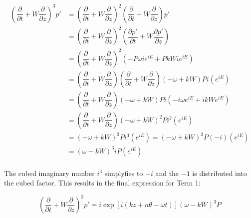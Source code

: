 \documentclass[]{aiaa-tc}%
\begin{document}
\begin{align*}
\left( \dfrac{\partial}{\partial t} + W \dfrac{\partial}{\partial z} \right)^3 p'
&= \left( \dfrac{\partial}{\partial t} + W \dfrac{\partial}{\partial z}
   \right)^2
   \left( \dfrac{\partial}{\partial t} + W \dfrac{\partial}{\partial z}
   \right)p' \\
&= \left( \dfrac{\partial}{\partial t} + W \dfrac{\partial}{\partial z}
   \right)^2
   \left( \dfrac{\partial p'}{\partial t} + W \dfrac{\partial p'}{\partial z}
   \right) \\
&= \left( \dfrac{\partial}{\partial t} + W \dfrac{\partial}{\partial z}
   \right)^2
   \left( -P\omega ie^{iE} + PkW ie^{iE}
   \right) \\
&= \left( \dfrac{\partial}{\partial t} + W \dfrac{\partial}{\partial z}
   \right)
   \left( \dfrac{\partial}{\partial t} + W \dfrac{\partial}{\partial z}
   \right) (-\omega + kW)P i (e^{iE}) \\
&= \left( \dfrac{\partial}{\partial t} + W \dfrac{\partial}{\partial z}
   \right) (-\omega + kW)P i
   (-i\omega e^{iE} + ikW e^{iE}) \\
&= \left( \dfrac{\partial}{\partial t} + W \dfrac{\partial}{\partial z}
   \right) (-\omega + kW)^2 P i^2 (e^{iE}) \\
&= (-\omega + kW)^3 P i^3(e^{iE}) = (-\omega + kW)^3P(-i) (e^{iE}) \\
&= (\omega - kW)^3iP (e^{iE}) \\
\end{align*}

The cubed imaginary number $i^3$ simplyfies to $-i$ and the $-1$ is distributed into the cubed factor.  This results in the final expression for Term 1:

\begin{equation}
\boxed{ \left( \dfrac{\partial}{\partial t}
          + W \dfrac{\partial}{\partial z} \right)^3 p'
    =  i\exp[i(kz + n\theta -\omega t)] (\omega - kW)^3 P}
\end{equation}
\end{document}
